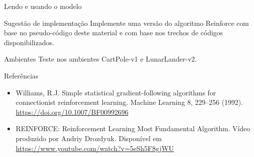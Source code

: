 \documentclass{beamer}
\begin{document}
\begin{frame}{Lendo e usando o modelo}
	
\end{frame}

\begin{frame}
	\begin{alertblock}{Sugestão de implementação}
		Implemente uma versão do algoritmo Reinforce com base no pseudo-código deste material e com base nos trechos de códigos disponibilizados. 
	\end{alertblock}

	\begin{alertblock}{Ambientes}
	Teste nos ambientes CartPole-v1 e LunarLander-v2. 
	\end{alertblock}
\end{frame}
			
\begin{frame}{Referências}
	\begin{itemize}
		\item Williams, R.J. Simple statistical gradient-following algorithms for connectionist reinforcement learning. Machine Learning 8, 229–256 (1992). \href{https://doi.org/10.1007/BF00992696}{https://doi.org/10.1007/BF00992696}
		\item REINFORCE: Reinforcement Learning Most Fundamental Algorithm. Vídeo produzido por Andriy Drozdyuk. Disponível em \href{https://www.youtube.com/watch?v=5eSh5F8gjWU}{https://www.youtube.com/watch?v=5eSh5F8gjWU}
	\end{itemize}
\end{frame}
		
\end{document}
